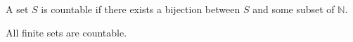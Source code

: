 \documentclass[12pt]{article}
\begin{document}
A set $S$ is countable if there exists a bijection between $S$ and some subset of $\mathbb{N}$.

All finite sets are countable.
\end{document}
